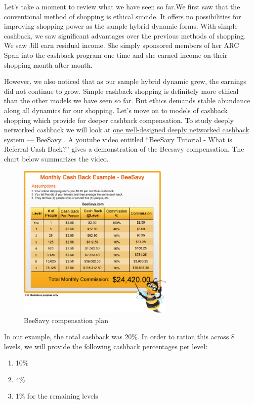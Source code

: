 \documentclass{article}%
\begin{document}
Let's take a moment to review what we have seen so far.We first saw that the conventional method of shopping is ethical suicide. It offers no possibilities for improving shopping power as the sample hybrid dynamic forms. With simple cashback, we saw significant advantages over the previous methods of shopping. 
We saw Jill earn residual income. She simply sponsored members of her ARC Span into the cashback program one time and she earned income on their shopping month after month.

However, we also noticed that as our sample hybrid dynamic grew, the earnings did not continue to grow. Simple cashback shopping is definitely more ethical than the other models we have seen so far. But ethics demands stable abundance along all dynamics for our shopping. Let's move on to models of cashback shopping which provide for deeper cashback compensation. To study deeply networked cashback we will look at \href{http://j.mp/cbk-beesavy}{one well-designed deeply networked cashback system --- BeeSavy} . A youtube video entitled ``BeeSavy Tutorial - What is Referral Cash Back?'' gives a demonstration of the Beesavy compensation. The chart below summarizes the video. 

\begin{figure}[h]
\centering
	\includegraphics[width=3in]{beesavy-table.png}
	\caption{BeeSavy compensation plan}
\end{figure}

 

In our example, the total cashback was 20\%. In order to ration this across 8 levels, we will provide the following cashback percentages per level:

\begin{enumerate}
\item   10\%
\item 4\%
\item  1\% for the remaining levels
\end{enumerate}	
\end{document}
